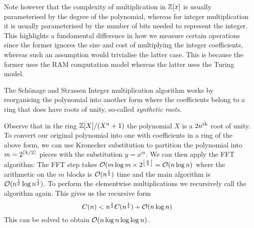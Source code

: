 \medskip

Note however that the complexity of multiplication in ${\mathbb Z}[x]$ is usually parameterised by the degree of the polynomial, whereas for integer multiplication it is usually parameterised by the number of bits needed to represent the integer. This highlights a fundamental difference in how we measure certain operations since the former ignores the size and cost of multiplying the integer coefficients, whereas such an assumption would trivialise the latter case. This is because the former uses the RAM computation model whereas the latter uses the Turing model. 

The Sch\"{o}nage and Strassen Integer multiplication algorithm works by reorganising the polynomial into another form where the coefficients belong to a ring that does have roots of unity, so-called \emph{synthetic roots}.

Observe that in the ring ${\mathbb Z}[X] / (X^n + 1)$ the polynomial $X$ is a $2n^{\textrm{th}}$ root of unity. To convert our original polynomial into one with coefficients in a ring of the above form, we can use Kronecker substitution to partition the polynomial into $m = 2^{\ceil{k/2}}$ pieces with the substitution $y = x^m$. We can then apply the FFT algorithm: The FFT step takes $\M{O}(m\log m \times 2^{\floor{\frac{k}{2}}} = \M{O}(n \log n)$ where the arithmetic on the $m$ blocks is $\mathcal O(n^{\frac{1}{2}})$ time and the main algorithm is $\mathcal O(n^{\frac{1}{2}}\log n^{\frac{1}{2}})$. To perform the elementwise multiplications we recursively call the algorithm again. This gives us the recursive form
\[
    C(n) < n^{\frac{1}{2}}C(n^{\frac{1}{2}}) + \mathcal O(n \log n)
\]
This can be solved to obtain $\mathcal O(n \log n \log \log n)$.





